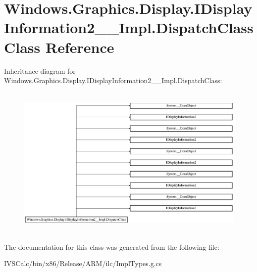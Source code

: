 \hypertarget{class_windows_1_1_graphics_1_1_display_1_1_i_display_information2_____impl_1_1_dispatch_class}{}\section{Windows.\+Graphics.\+Display.\+I\+Display\+Information2\+\_\+\+\_\+\+Impl.\+Dispatch\+Class Class Reference}
\label{class_windows_1_1_graphics_1_1_display_1_1_i_display_information2_____impl_1_1_dispatch_class}
Inheritance diagram for Windows.\+Graphics.\+Display.\+I\+Display\+Information2\+\_\+\+\_\+\+Impl.\+Dispatch\+Class\+:\begin{figure}[H]
\begin{center}
\leavevmode
\includegraphics[height=7.530562cm]{class_windows_1_1_graphics_1_1_display_1_1_i_display_information2_____impl_1_1_dispatch_class}
\end{center}
\end{figure}


The documentation for this class was generated from the following file\+:\begin{DoxyCompactItemize}
\item 
I\+V\+S\+Calc/bin/x86/\+Release/\+A\+R\+M/ilc/Impl\+Types.\+g.\+cs\end{DoxyCompactItemize}
